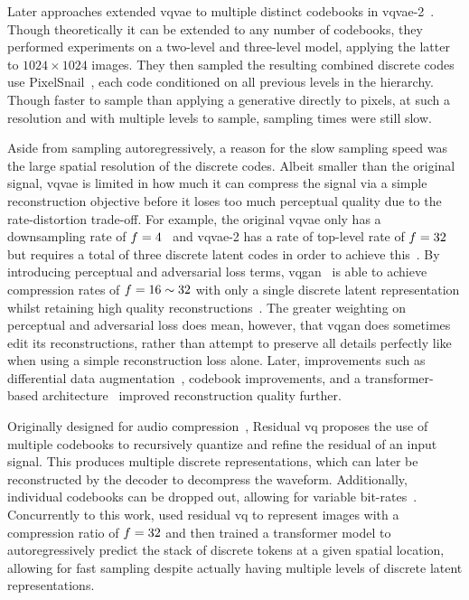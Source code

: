 Later approaches extended \gls{vqvae} to multiple distinct codebooks in
\acrshort{vqvae}-2~\cite{razavi2019generating}. Though theoretically it can be
extended to any number of codebooks, they performed experiments on a two-level
and three-level model, applying the latter to $1024 \times 1024$ images. They
then sampled the resulting combined discrete codes use
PixelSnail~\cite{chen2017snail}, each code conditioned on all previous levels in
the hierarchy. Though faster to sample than applying a generative directly to
pixels, at such a resolution and with multiple levels to sample, sampling times
were still slow.

Aside from sampling autoregressively, a reason for the slow sampling speed was
the large spatial resolution of the discrete codes. Albeit smaller than the
original signal, \gls{vqvae} is limited in how much it can compress the signal
via a simple reconstruction objective before it loses too much perceptual
quality due to the rate-distortion trade-off. For example, the original
\gls{vqvae} only has a downsampling rate of
$f=4$~\cite{oord2017vqvae} and \gls{vqvae}-2 has a rate of
top-level rate of $f=32$ but requires a total of three discrete
latent codes in order to achieve this~\cite{razavi2019generating}. By
introducing perceptual and adversarial loss terms,
\gls{vqgan}~\cite{esser2021taming} is able to achieve compression rates of
$f=16 \sim 32$ with only a single discrete latent representation
whilst retaining high quality reconstructions~\cite{esser2021taming}. The
greater weighting on perceptual and adversarial loss does mean, however, that
\gls{vqgan} does sometimes edit its reconstructions, rather than attempt to
preserve all details perfectly like when using a simple reconstruction loss
alone. Later, improvements such as differential data
augmentation~\cite{bondtaylor2021unleashing}, codebook improvements, and a
transformer-based architecture~\cite{yu2021vqgan} improved reconstruction
quality further.

Originally designed for audio compression~\cite{zeghidour2021soundstream},
Residual \gls{vq} proposes the use of multiple codebooks to recursively quantize
and refine the residual of an input signal. This produces multiple discrete
representations, which can later be reconstructed by the decoder to decompress
the waveform. Additionally, individual codebooks can be dropped out, allowing
for variable bit-rates~\cite{zeghidour2021soundstream}. Concurrently to this
work, \citet{lee2022rqvae} used residual \gls{vq} to represent images with a
compression ratio of $f=32$ and then trained a transformer model
to autoregressively predict the stack of discrete tokens at a given spatial
location, allowing for fast sampling despite actually having multiple levels of
discrete latent representations\cite{lee2022rqvae}.

